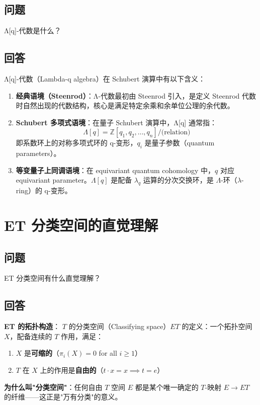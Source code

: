 \subsection{问题}
Λ[q]-代数是什么？
\subsection{回答}
Λ[q]-代数（Lambda-q algebra）在 Schubert 演算中有以下含义：

\begin{enumerate}
\item \textbf{经典语境（Steenrod）}：Λ-代数最初由 Steenrod 引入，是定义 Steenrod 代数时自然出现的代数结构，核心是满足特定余乘和余单位公理的余代数。

\item \textbf{Schubert 多项式语境}：在量子 Schubert 演算中，Λ[q] 通常指：
$$\Lambda[q] = \mathbb{Z}[q_1, q_2, \dots, q_n] / \text{(relation)}$$
即系数环上的对称多项式环的 q-变形，$q_i$ 是量子参数（quantum parameters）。

\item \textbf{等变量子上同调语境}：在 equivariant quantum cohomology 中，$q$ 对应 equivariant parameter。$\Lambda[q]$ 是配备 $\lambda_q$ 运算的分次交换环，是 $\Lambda$-环（$\lambda$-ring）的 q-变形。
\end{enumerate}


\section{ET 分类空间的直觉理解}\label{sec:ETIntuition}
\subsection{问题}
ET 分类空间有什么直觉理解？

\subsection{回答}
\textbf{ET 的拓扑构造}：
$T$ 的分类空间（Classifying space）$ET$ 的定义：一个拓扑空间 $X$，配备连续的 $T$ 作用，满足：
\begin{enumerate}
\item $X$ 是\textbf{可缩的}（$\pi_i(X) = 0$ for all $i \geq 1$）
\item $T$ 在 $X$ 上的作用是\textbf{自由的}（$t \cdot x = x \implies t = e$）
\end{enumerate}

\textbf{为什么叫"分类空间"}：任何自由 $T$ 空间 $E$ 都是某个唯一确定的 $T$-映射 $E \to ET$ 的纤维——这正是"万有分类"的意义。


